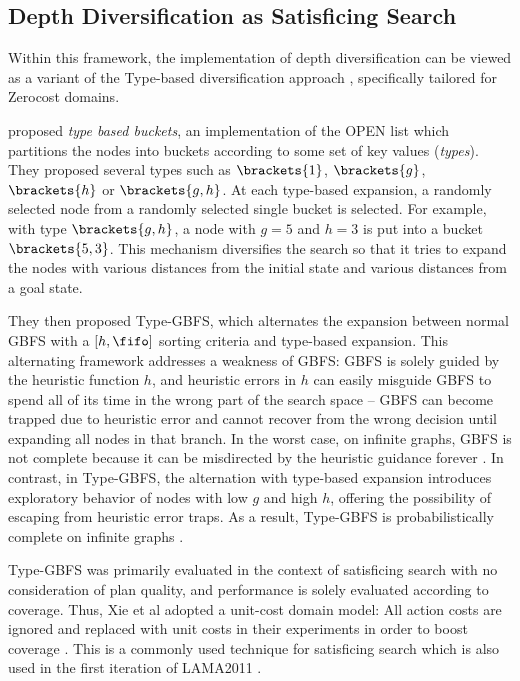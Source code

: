 \subsection{Depth Diversification as Satisficing Search}
\label{sec:depth-vs-types}
Within this framework, the implementation of depth diversification can be viewed as a variant of the Type-based diversification approach \cite{xie14type},  specifically tailored for Zerocost domains.

\citeauthor{xie14type} proposed \emph{type based buckets}, an implementation of the OPEN list which partitions the nodes into buckets according to some set of key values (\emph{types}). They proposed several types such as $\brackets{1}$, $\brackets{g}$, $\brackets{h}$ or $\brackets{g,h}$. At each type-based expansion, a randomly selected node from a randomly selected single bucket is selected. For example, with type $\brackets{g,h}$, a node with $g=5$ and $h=3$ is put into a bucket  $\brackets{5,3}$. This mechanism diversifies the search so that it tries to expand the nodes with various distances from the initial state and various distances from a goal state.

They then proposed Type-GBFS, which alternates the expansion between normal GBFS with a $[h,\fifo]$ sorting criteria and type-based expansion. This alternating framework addresses a weakness of GBFS: 
GBFS is solely guided by the heuristic function $h$, and heuristic errors in $h$ can easily misguide GBFS to spend all of its time in the wrong part of the search space -- GBFS can become trapped due to heuristic error and cannot recover from the wrong decision until expanding all nodes in that branch.
In the worst case, on infinite graphs, GBFS is not complete because it can be misdirected by the heuristic guidance forever \cite{Valenzano2016}.
In contrast, in Type-GBFS, the alternation with type-based expansion introduces exploratory behavior of nodes with low $g$ and high $h$, offering the possibility of escaping from heuristic error traps.
As a result, Type-GBFS is probabilistically complete on infinite graphs \cite{Valenzano2016}.

Type-GBFS was primarily evaluated in the context of satisficing search with no consideration of plan quality, and performance is solely evaluated according to coverage.
Thus, Xie et al adopted a unit-cost domain model: All action costs are ignored and replaced with unit costs in their experiments in order to boost coverage \cite{xie14type}. This is a commonly used technique for satisficing search which is also used in the first iteration of LAMA2011 \cite{richter2011lama}. 

